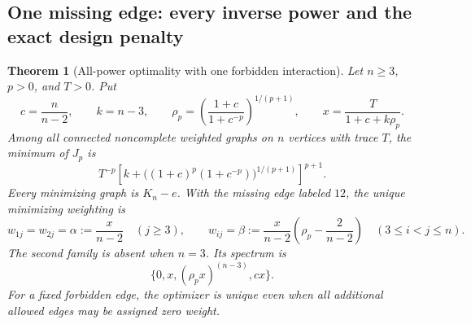 \documentclass[11pt,a4paper]{article}
\newtheorem{theorem}{Theorem}[section]
\theoremstyle{definition}
\theoremstyle{remark}
\numberwithin{equation}{section}
\begin{document}
\subsection{One missing edge: every inverse power and the exact design penalty}

\begin{theorem}[All-power optimality with one forbidden interaction]
\label{p1:thm:design-single-edge}
Let $n\ge3$, $p>0$, and $T>0$.  Put
\[
 c=\frac n{n-2},\qquad k=n-3,\qquad
 \rho_p=\left(\frac{1+c}{1+c^{-p}}\right)^{1/(p+1)},\qquad
 x=\frac{T}{1+c+k\rho_p}.
\]
Among all connected noncomplete weighted graphs on $n$ vertices with
trace $T$, the minimum of $J_p$ is
\begin{equation}\label{p1:eq:design-single-value}
 \boxed{\quad
 T^{-p}\left[k+
 \big((1+c)^p(1+c^{-p})\big)^{1/(p+1)}\right]^{p+1}.
 \quad}
\end{equation}
Every minimizing graph is $K_n-e$.  With the missing edge labeled $12$,
the unique minimizing weighting is
\begin{equation}\label{p1:eq:design-single-weights}
 w_{1j}=w_{2j}=\alpha:=\frac{x}{n-2}\quad(j\ge3),\qquad
 w_{ij}=\beta:=\frac{x}{n-2}
       \left(\rho_p-\frac2{n-2}\right)\quad(3\le i<j\le n).
\end{equation}
The second family is absent when $n=3$.  Its spectrum is
\[
 \{0,x,(\rho_p x)^{(n-3)},cx\}.
\]
For a fixed forbidden edge, the optimizer is unique even when all
additional allowed edges may be assigned zero weight.
\end{theorem}
\end{document}

